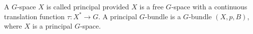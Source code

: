 A $G$-space $X$ is called principal provided $X$ is a free $G$-space with a continuous translation function $\tau: X^* \rightarrow G$. A principal $G$-bundle is a $G$-bundle $(X, p, B)$, where $X$ is a principal $G$-space.